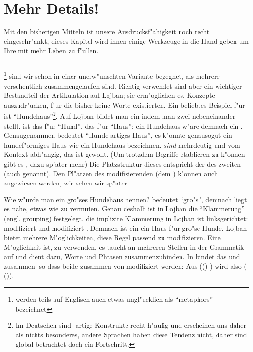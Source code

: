 \chapter{Mehr Details!}
Mit den bisherigen Mitteln ist unsere Ausdrucksf"ahigkeit noch recht eingeschr"ankt, dieses Kapitel wird ihnen einige Werkzeuge in die Hand
geben um Ihre  mit mehr Leben zu f"ullen.

\section{}
 \footnote{ werden teils auf Englisch auch etwas ungl"ucklich als ``metaphors'' bezeichnet} sind wir schon in einer unerw"unschten Variante begegnet, als mehrere  versehentlich zusammengelaufen sind. Richtig
verwendet sind  aber ein wichtiger Bestandteil der Artikulation auf Lojban; sie erm"oglichen es, Konzepte auszudr"ucken, f"ur die
bisher keine Worte existierten. Ein beliebtes Beispiel f"ur  ist ``Hundehaus''\footnote{Im Deutschen sind -artige Konstrukte
recht h"aufig und erscheinen uns daher als nichts besonderes, andere Sprachen haben diese Tendenz nicht, daher sind  global betrachtet doch ein Fortschritt.}. Auf Lojban bildet man ein  indem man zwei  nebeneinander stellt.  ist das  f"ur ``Hund'',  das f"ur ``Haus''; ein Hundehaus w"are demnach ein . Genaugenommen bedeutet 
 ``Hunde-artiges Haus'', es k"onnte genausogut ein hundef"ormiges Haus wie ein Hundehaus bezeichnen.  \emph{sind} mehrdeutig und 
 vom Kontext abh"angig, das ist gewollt. (Um trotzdem Begriffe etablieren zu k"onnen gibt es , dazu sp"ater mehr)
Die Platzstruktur dieses  entspricht der des zweiten  (auch  genannt). Den Pl"atzen des modifizierenden
 (dem ) k"onnen auch  zugewiesen werden, wie sehen wir sp"ater.

Wie w"urde man ein gro"ses Hundehaus nennen?  bedeutet ``gro"s'', demnach liegt es nahe, etwas wie  zu vermuten.
Genau deshalb ist in Lojban die ``Klammerung'' (engl. grouping) festgelegt, die implizite Klammerung in Lojban ist linksgerichtet: 
modifiziert  und  modifiziert . Demnach ist ein  ein Haus f"ur gro"se Hunde.
Lojban bietet mehrere M"oglichkeiten, diese Regel passend zu modifizieren. Eine M"oglichkeit ist,  zu verwenden, es taucht an mehreren
Stellen in der Grammatik auf und dient dazu, Worte und Phrasen zusammenzubinden. In  bindet das  
und  zusammen, so dass beide zusammen von  modifiziert werden: Aus (() ) wird also
( ()).

